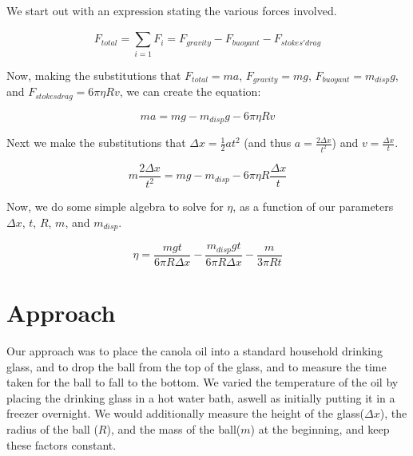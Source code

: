 \documentclass[aps,twocolumn,showpacs,preprintnumbers]{revtex4}
\begin{document}
We start out with an expression stating the various forces involved.

\begin{equation}\label{eq1}
F_{total} = \sum_{i=1}^{} F_{i} = F_{gravity} - F_{buoyant} - F_{stokes' drag}
\end{equation}

Now, making the substitutions\cite{RHK} that $F_{total}=ma$, $F_{gravity}=mg$, $F_{buoyant} = m_{disp}g$\cite{Footnote}, and $F_{stokes drag}=6\pi \eta Rv$, we can create the equation:

\begin{equation}\label{eq2}
ma = mg - m_{disp}g - 6\pi \eta Rv
\end{equation} 

Next we make the substitutions that $\Delta x=\frac{1}{2}at^2$ (and thus $a=\frac{2\Delta x}{t^2}$) and $v=\frac{\Delta x}{t}$.

\begin{equation}\label{eq3}
m\frac{2\Delta x}{t^2} = mg - m_{disp} - 6\pi \eta R\frac{\Delta x}{t}
\end{equation}

Now, we do some simple algebra to solve for $\eta$, as a function of our parameters $\Delta x$, $t$, $R$, $m$, and $m_{disp}$.

\begin{equation}\label{eq4}
\eta = \frac{mgt}{6\pi R \Delta x} - \frac{m_{disp}gt}{6\pi R \Delta x} - \frac{m}{3\pi Rt}
\end{equation}


\section{Approach}


Our approach was to place the canola oil into a standard household drinking glass, and to drop the ball from the top of the glass, and to measure the time taken for the ball to fall to the bottom. We varied the temperature of the oil by placing the drinking glass in a hot water bath, aswell as initially putting it in a freezer overnight. We would additionally measure the height of the glass($\Delta x$), the radius of the ball ($R$), and the mass of the ball($m$) at the beginning, and keep these factors constant.

\end{document}
